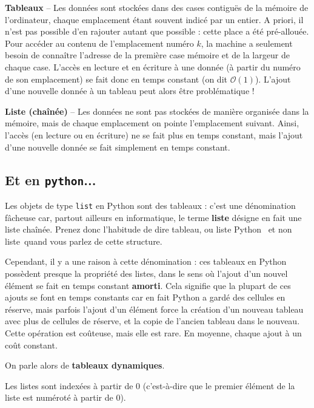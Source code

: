 \begin{defi}{}
  
  \textbf{Tableaux} --  
  Les données sont stockées dans des cases contiguës de la mémoire de l'ordinateur, chaque emplacement étant souvent indicé par un entier. 
    A priori, il n'est pas possible d'en rajouter autant que possible : cette place a été pré-allouée. 
    Pour accéder au contenu de l'emplacement numéro $k$, la machine a seulement besoin de connaître 
l'adresse de la première case mémoire et de la largeur de chaque case. 
    L'accès en lecture et en écriture à une donnée (à partir du numéro de son emplacement) se fait donc en temps constant (on dit $\mathcal{O}(1)$).
    L'ajout d'une nouvelle donnée à un tableau peut alors être problématique !


  \textbf{Liste (chaînée)}  -- Les données ne sont pas stockées de manière organisée dans la mémoire, 
mais de chaque emplacement on pointe l'emplacement suivant. 
    Ainsi, l'accès (en lecture ou en écriture) ne se fait plus en temps constant, mais l'ajout d'une nouvelle donnée se fait simplement en temps constant. 
\end{defi}

\subsection{Et en \texttt{python}...}

Les objets de type \texttt{list} en Python sont des tableaux : c'est une 
dénomination fâcheuse car, partout ailleurs en informatique, le terme
\textbf{liste} désigne en fait une liste chaînée. Prenez donc
l'habitude de dire \og tableau\fg, ou \og liste Python \fg\ et non \og liste\fg\ quand vous parlez de cette
structure.

Cependant, il y a une raison à cette dénomination : ces tableaux en Python possèdent presque 
la propriété des listes, dans le sens où l'ajout d'un nouvel élément se fait en temps constant 
\textbf{amorti}. Cela signifie que la plupart de ces ajouts se font en temps constants car en fait 
Python a \og gardé des cellules en réserve\fg, mais parfois l'ajout d'un élément force la création 
d'un nouveau tableau avec plus de cellules de réserve, et la copie de l'ancien tableau dans le 
nouveau. Cette opération est coûteuse, mais elle 
est rare. En moyenne, chaque ajout à un coût constant.

On parle alors de \textbf{tableaux dynamiques}.


\begin{rem}
Les listes sont indexées à partir de 0 (c'est-à-dire que le premier élément de la liste est numéroté à partir de 0). 
\end{rem}


